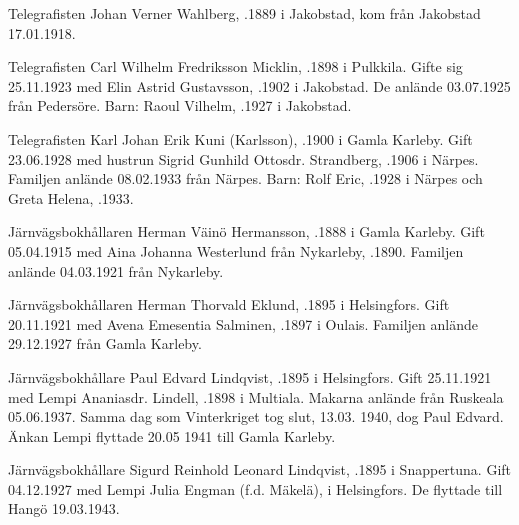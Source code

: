 {Telegrafisten Johan Verner Wahlberg, .1889 i Jakobstad, kom från Jakobstad 17.01.1918.


Telegrafisten Carl Wilhelm Fredriksson Micklin, .1898 i Pulkkila. Gifte sig 25.11.1923 med Elin Astrid Gustavsson, .1902 i Jakobstad. De anlände 03.07.1925 från Pedersöre.
Barn: Raoul Vilhelm, .1927 i Jakobstad.


Telegrafisten Karl Johan Erik Kuni (Karlsson), .1900 i Gamla Karleby. Gift 23.06.1928 med hustrun Sigrid Gunhild Ottosdr. Strandberg, .1906 i Närpes. Familjen anlände 08.02.1933 från Närpes.
Barn: Rolf Eric, .1928 i Närpes och Greta Helena, .1933.


Järnvägsbokhållaren Herman Väinö Hermansson, .1888 i Gamla Karleby. Gift 05.04.1915 med Aina Johanna Westerlund från Nykarleby, .1890. Familjen anlände 04.03.1921 från Nykarleby.
\begin{jhchildren}
  \item {}
  \item {}
  \item {}
\end{jhchildren}


Järnvägsbokhållaren Herman Thorvald Eklund, .1895 i Helsingfors. Gift 20.11.1921 med Avena Emesentia Salminen, .1897 i Oulais. Familjen anlände 29.12.1927 från Gamla Karleby.
\begin{jhchildren}
  \item {}
  \item {}
  \item {}
\end{jhchildren}


Järnvägsbokhållare Paul Edvard Lindqvist, .1895 i Helsingfors. Gift 25.11.1921 med Lempi Ananiasdr. Lindell, .1898 i Multiala. Makarna anlände från Ruskeala 05.06.1937. Samma dag som Vinterkriget tog slut, 13.03. 1940, dog Paul Edvard. Änkan Lempi flyttade 20.05 1941 till Gamla Karleby.


Järnvägsbokhållare Sigurd Reinhold Leonard Lindqvist, .1895 i Snappertuna. Gift 04.12.1927 med Lempi Julia Engman (f.d. Mäkelä),  i Helsingfors. De flyttade till Hangö 19.03.1943.


}
